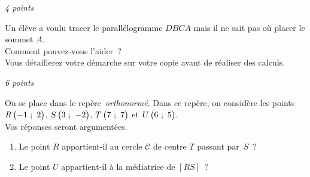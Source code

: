 \begin{minipage}{0.45\textwidth}
\thispagestyle{sujet1}

\vspace*{1em}

\exercice\hfill \emph{4 points}

Un élève a voulu tracer le parallélogramme $DBCA$ mais il ne sait pas où placer le sommet $A$.\\ Comment pouvez-vous l'aider~?\\ Vous détaillerez votre démarche sur votre copie avant de réaliser des calculs.

\begin{center}


\end{center}


\vspace*{2em}

\exercice\hfill \emph{6 points}

On se place dans le repère~\emph{orthonormé}. Dans ce repère, on considère les points $R\begin{pmatrix}-1~;~2\end{pmatrix}$, $S\begin{pmatrix}3~;~-2\end{pmatrix}$, $T\begin{pmatrix}7~;~7\end{pmatrix}$ et $U\begin{pmatrix}6~;~5\end{pmatrix}$.\\Vos réponses seront argumentées.

	\begin{enumerate}
		\item Le point $R$ appartient-il au cercle $\mathscr{C}$ de centre $T$ passant par~$S$~?
		\item Le point $U$ appartient-il à la médiatrice de $\left[RS\right]$~?
	\end{enumerate}



\vspace{-2em}


\end{minipage}
\newpage


